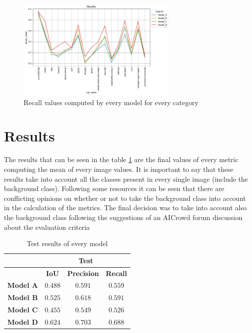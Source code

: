 \documentclass[a4paper,10pt]{report}
\begin{document}
\begin{figure}[h]
    \centering
    \includegraphics[width=0.7\textwidth]{assets/img/cat_recall.png}
    \caption{Recall values computed by every model for every category}
    \label{fig:cat_recall}
\end{figure}


\clearpage\section{Results}\label{sec:section-52}

The results that can be seen in the table \ref{table:test_results} are the final values of every metric computing the mean of every image values. It is important to say that these results take into account all the classes present in every single image (include the background class). Following some resources it can be seen that there are conflicting opinions on whether or not to take the background class into account in the calculation of the metrics. The final decision was to take into account also the background class following the suggestions of an AICrowd forum discussion about the evaluation criteria \cite{evalcriteria}

\begin{table}[h]
  \center
  \begin{tabular}{|c|c|c|c|}
  \hline
    \multirow{2}{*}{} & \multicolumn{3}{c|}{\textbf{Test}}  \\ \hline                   
                        & \textbf{IoU} & \textbf{Precision} & \textbf{Recall} \\ \hline
    \textbf{Model A}   & $0.488$ & $0.591$ & $0.559$  \\ \hline
    \textbf{Model B}      & $0.525$ & $0.618$ & $0.591$ \\ \hline
    \textbf{Model C}       & $0.455$ & $0.549$ & $0.526$  \\ \hline
    \textbf{Model D} & $0.624$ & $ 0.703$ & $0.688$  \\ \hline
  \end{tabular}
  \caption{Test results of every model}
  \label{table:test_results}
\end{table}
\end{document}
